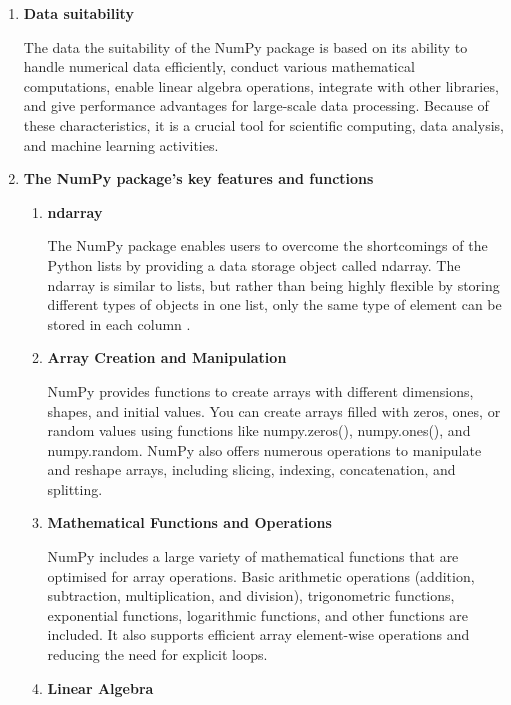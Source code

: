 \begin{enumerate}
	
	\item \textbf{Data suitability}
	
	The data the suitability of the NumPy package is based on its ability to handle numerical data efficiently, conduct various mathematical computations, enable linear algebra operations, integrate with other libraries, and give performance advantages for large-scale data processing. Because of these characteristics, it is a crucial tool for scientific computing, data analysis, and machine learning activities.
	
	
	\item \textbf{The NumPy package's key features and functions} 
	
	\begin{enumerate}
		
		\item \textbf{ndarray}
		
		The NumPy package enables users to overcome the shortcomings of the Python lists by providing a data storage object called ndarray. The ndarray is similar to lists, but rather than being highly flexible by storing different types of objects in one list, only the same type of element can be stored in each column \cite{NumPy2008}. 
		
		\item \textbf{Array Creation and Manipulation}
		
		NumPy provides functions to create arrays with different dimensions, shapes, and initial values. You can create arrays filled with zeros, ones, or random values using functions like numpy.zeros(), numpy.ones(), and numpy.random. NumPy also offers numerous operations to manipulate and reshape arrays, including slicing, indexing, concatenation, and splitting.
		
		\item \textbf{Mathematical Functions and Operations}
		
		NumPy includes a large variety of mathematical functions that are optimised for array operations. Basic arithmetic operations (addition, subtraction, multiplication, and division), trigonometric functions, exponential functions, logarithmic functions, and other functions are included. It also supports efficient array element-wise operations and reducing the need for explicit loops.
		
		\item \textbf{Linear Algebra}
		

\end{enumerate}
\end{enumerate}
